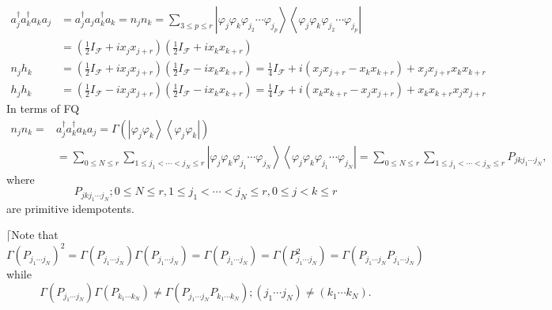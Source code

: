 \documentclass[aps,preprint]{revtex4}%
\begin{document}
\begin{align}
a_{j}^{\dagger}a_{k}^{\dagger}a_{k}a_{j}  &  =a_{j}^{\dagger}a_{j}%
a_{k}^{\dagger}a_{k}=n_{j}n_{k}=\sum_{3\leq p\leq r}\left\vert \varphi
_{j}\varphi_{k}\varphi_{j_{2}}\cdots\varphi_{j_{p}}\right\rangle \left\langle
\varphi_{j}\varphi_{k}\varphi_{j_{2}}\cdots\varphi_{j_{p}}\right\vert \\
&  =\left(  \frac{1}{2}I_{\mathcal{F}}+ix_{j}x_{j+r}\right)  \left(  \frac
{1}{2}I_{\mathcal{F}}+ix_{k}x_{k+r}\right) \\
n_{j}h_{k}  &  =\left(  \frac{1}{2}I_{\mathcal{F}}+ix_{j}x_{j+r}\right)
\left(  \frac{1}{2}I_{\mathcal{F}}-ix_{k}x_{k+r}\right)  =\frac{1}%
{4}I_{\mathcal{F}}+i\left(  x_{j}x_{j+r}-x_{k}x_{k+r}\right)  +x_{j}%
x_{j+r}x_{k}x_{k+r}\\
h_{j}h_{k}  &  =\left(  \frac{1}{2}I_{\mathcal{F}}-ix_{j}x_{j+r}\right)
\left(  \frac{1}{2}I_{\mathcal{F}}-ix_{k}x_{k+r}\right)  =\frac{1}%
{4}I_{\mathcal{F}}+i\left(  x_{k}x_{k+r}-x_{j}x_{j+r}\right)  +x_{k}%
x_{k+r}x_{j}x_{j+r}%
\end{align}
In terms of FQ
\begin{align}
n_{j}n_{k}=  &  a_{j}^{\dagger}a_{k}^{\dagger}a_{k}a_{j}=\Gamma\left(
\left\vert \varphi_{j}\varphi_{k}\right\rangle \left\langle \varphi_{j}%
\varphi_{k}\right\vert \right) \nonumber\\
&  =\sum_{0\leq N\leq r}\sum_{1\leq j_{1}<\cdots<j_{N}\leq r}\left\vert
\varphi_{j}\varphi_{k}\varphi_{j_{1}}\cdots\varphi_{j_{N}}\right\rangle
\left\langle \varphi_{j}\varphi_{k}\varphi_{j_{1}}\cdots\varphi_{j_{N}%
}\right\vert =\sum_{0\leq N\leq r}\sum_{1\leq j_{1}<\cdots<j_{N}\leq
r}P_{jkj_{1}\cdots j_{N}},
\end{align}
where
\begin{equation}
P_{jkj_{1}\cdots j_{N}};0\leq N\leq r,1\leq j_{1}<\cdots<j_{N}\leq r,0\leq
j<k\leq r
\end{equation}
are primitive idempotents.

$\lceil$Note that
\begin{equation}
\Gamma\left(  P_{j_{1}\cdots j_{N}}\right)  ^{2}=\Gamma\left(  P_{j_{1}\cdots
j_{N}}\right)  \Gamma\left(  P_{j_{1}\cdots j_{N}}\right)  =\Gamma\left(
P_{j_{1}\cdots j_{N}}\right)  =\Gamma\left(  P_{j_{1}\cdots j_{N}}^{2}\right)
=\Gamma\left(  P_{j_{1}\cdots j_{N}}P_{j_{1}\cdots j_{N}}\right)
\end{equation}
while
\begin{equation}
\Gamma\left(  P_{j_{1}\cdots j_{N}}\right)  \Gamma\left(  P_{k_{1}\cdots
k_{N}}\right)  \neq\Gamma\left(  P_{j_{1}\cdots j_{N}}P_{k_{1}\cdots k_{N}%
}\right)  ;\left(  j_{1}\cdots j_{N}\right)  \neq\left(  k_{1}\cdots
k_{N}\right)  .
\end{equation}
\end{document}
